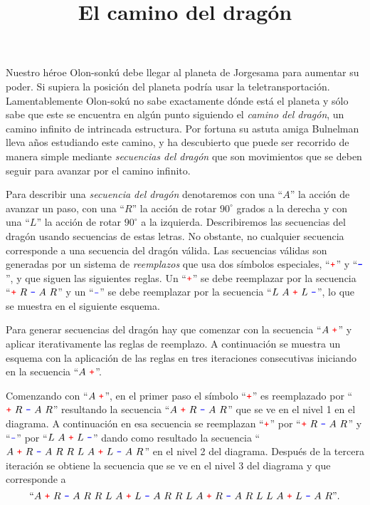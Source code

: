 \documentclass{oci}
\title{El camino del drag\'on}
\renewcommand{\u}{{\color{red}\texttt{+}}}
\renewcommand{\d}{{\color{blue}\texttt{-}}}
\begin{document}
\maketitle
Nuestro héroe Olon-sonkú debe llegar al planeta de Jorgesama para aumentar su poder.
Si supiera la posición del planeta podría usar la teletransportación. Lamentablemente Olon-sokú no sabe exactamente dónde está el planeta y sólo sabe que este se encuentra en algún punto siguiendo el \emph{camino del dragón}, un camino infinito de intrincada estructura. 
Por fortuna %
su astuta amiga Bulnelman lleva años estudiando este camino, y ha descubierto que puede ser recorrido de manera simple mediante \emph{secuencias del dragón} que son movimientos que se deben seguir para avanzar por el camino infinito.

Para describir una \emph{secuencia del dragón} denotaremos con una ``$A$'' la acción de avanzar un paso, con una ``$R$'' la acción de rotar $90^{\circ}$ grados a la derecha y con una ``$L$'' la acción de rotar $90^{\circ}$ a la izquierda.
Describiremos las secuencias del dragón usando secuencias de estas letras. No obstante, no cualquier secuencia corresponde a una secuencia del dragón válida.
Las secuencias válidas son generadas por un sistema de \emph{reemplazos} que usa dos símbolos especiales, ``$\u$'' y ``$\d$'', y que siguen las siguientes reglas.
Un ``$\u$'' se debe reemplazar por la secuencia ``$\u\ R\ \d\ A\ R$'' y un ``$\d$'' se debe reemplazar por la secuencia ``$L\ A\ \u\ L\ \d$'', lo que se muestra en el siguiente esquema.
\begin{center}
\scalebox{0.8}
{ 
}
\end{center}

Para generar secuencias del dragón hay que comenzar con la secuencia ``$A\ \u$'' y aplicar iterativamente las reglas de reemplazo.
A continuación se muestra un esquema con la aplicación de las reglas en tres iteraciones consecutivas iniciando en la secuencia ``$A\ \u$''.
\begin{center}
\scalebox{0.8}
{ 
}
\end{center}

Comenzando con ``$A\ \u$'', en el primer paso el símbolo ``$\u$'' es reemplazado por ``$\u\ R\ \d\ A\ R$'' resultando la secuencia ``$A\ \u\ R\ \d\ A\ R$'' que se ve en el nivel 1 en el diagrama.
A continuación en esa secuencia se reemplazan ``$\u$'' por ``$\u\ R\ \d\ A\ R$'' y ``$\d$'' por ``$L\ A\ \u\ L\ \d$'' dando como resultado la secuencia 
``$A\ \u\ R\ \d\ A\ R\ R\ L\ A\ \u\ L\ \d\ A\ R$'' en el nivel 2 del diagrama.
Después de la tercera iteración se obtiene la secuencia que se ve en el nivel 3 del diagrama y que corresponde a
$$\text{``}A\ \u\ R\ \d\ A\ R\ R\ L\ A\ \u\ L\ \d\ A\ R\ R\ L\ A\ \u\ R\ \d\ A\ R\ L\ L\ A\ \u\ L\ \d\ A\ R\text{''}.$$
\end{document}
